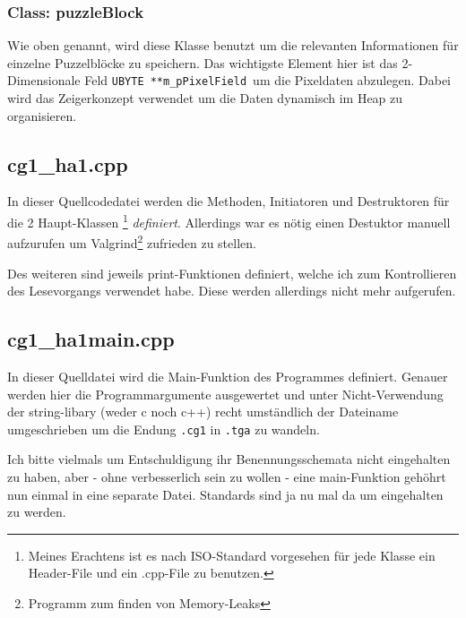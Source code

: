 \documentclass{article}
\begin{document}
\subsubsection{Class: puzzleBlock}
Wie oben genannt, wird diese Klasse benutzt um die relevanten Informationen für einzelne Puzzelblöcke zu speichern.
Das wichtigste Element hier ist das 2-Dimensionale Feld \texttt{UBYTE **m\_pPixelField}\ um die Pixeldaten abzulegen.
Dabei wird das Zeigerkonzept verwendet um die Daten dynamisch im Heap zu organisieren.

\subsection{cg1\_ha1.cpp}
In dieser Quellcodedatei werden die Methoden, Initiatoren und Destruktoren für die 2 Haupt-Klassen
\footnote[1]{Meines Erachtens ist es nach ISO-Standard vorgesehen für jede Klasse ein Header-File und ein
.cpp-File zu benutzen.} \emph{definiert}.
Allerdings war es nötig einen Destuktor manuell aufzurufen um Valgrind\footnote[2]{Programm zum finden von Memory-Leaks}
zufrieden zu stellen.

Des weiteren sind jeweils print-Funktionen definiert, welche ich zum Kontrollieren des Lesevorgangs verwendet habe. Diese
werden allerdings nicht mehr aufgerufen.

\subsection{cg1\_ha1\textunderscore main.cpp}
In dieser Quelldatei wird die Main-Funktion des Programmes definiert. Genauer werden hier die Programmargumente ausgewertet
und unter Nicht-Verwendung der string-libary (weder c noch c++) recht umständlich der Dateiname umgeschrieben um die Endung
\texttt{.cg1} in \texttt{.tga} zu wandeln.

Ich bitte vielmals um Entschuldigung ihr Benennungsschemata nicht eingehalten zu haben, aber - ohne verbesserlich sein zu wollen -
eine main-Funktion gehöhrt nun einmal in eine separate Datei. Standards sind ja nu mal da um eingehalten zu werden.
\end{document}
